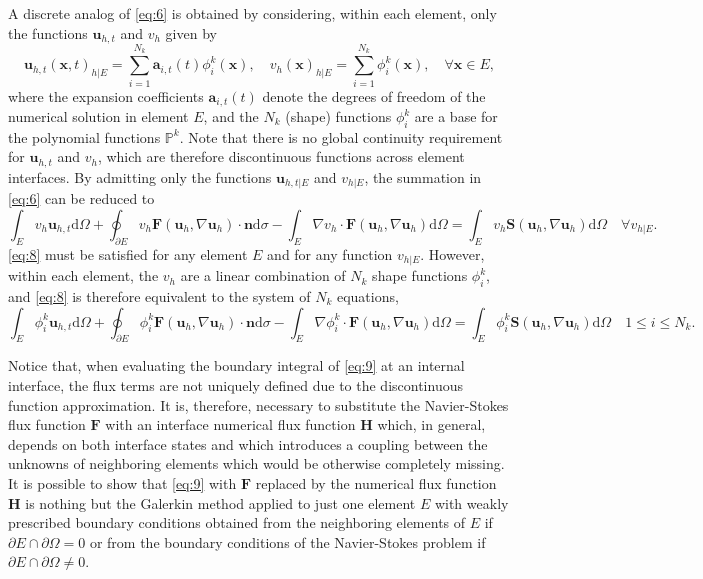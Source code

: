 \documentclass{develop-note}
\begin{document}
A discrete analog of \autoref{eq:6} is obtained by considering, within each element, only the functions $\mathbf{u}_{h,t}$ and $v_{h}$ given by
\begin{equation}
  \mathbf{u}_{h,t}(\mathbf{x},t)_{h|E}=\sum_{i=1}^{N_{k}}\mathbf{a}_{i,t}(t)\phi_{i}^{k}(\mathbf{x}),\quad v_{h}(\mathbf{x})_{h|E}=\sum_{i=1}^{N_{k}}\phi_{i}^{k}(\mathbf{x}),\quad\forall\mathbf{x}\in E,
\end{equation}
where the expansion coefficients $\mathbf{a}_{i,t}(t)$ denote the degrees of freedom of the numerical solution in element $E$, and the $N_{k}$ (shape) functions $\phi_{i}^{k}$ are a base for the polynomial functions $\mathbb{P}^{k}$. Note that there is no global continuity requirement for $\mathbf{u}_{h,t}$ and $v_{h}$, which are therefore discontinuous functions across element interfaces. By admitting only the functions $\mathbf{u}_{h,t|E}$ and $v_{h|E}$, the summation in \autoref{eq:6} can be reduced to
\begin{equation}
  \label{eq:8}
  \int_{E}v_{h}\mathbf{u}_{h,t}\mathrm{d}\Omega+\oint_{\partial E}v_{h}\mathbf{F}(\mathbf{u}_{h},\nabla\mathbf{u}_{h})\cdot\mathbf{n}\mathrm{d}\sigma-\int_{E}\nabla v_{h}\cdot\mathbf{F}(\mathbf{u}_{h},\nabla\mathbf{u}_{h})\mathrm{d}\Omega=\int_{E}v_{h}\mathbf{S}(\mathbf{u}_{h},\nabla\mathbf{u}_{h})\mathrm{d}\Omega\quad\forall v_{h|E}.
\end{equation}
\autoref{eq:8} must be satisfied for any element $E$ and for any function $v_{h|E}$. However, within each element, the $v_{h}$ are a linear combination of $N_{k}$ shape functions $\phi_{i}^{k}$, and \autoref{eq:8} is therefore equivalent to the system of $N_{k}$ equations,
\begin{equation}
  \label{eq:9}
  \int_{E}\phi_{i}^{k}\mathbf{u}_{h,t}\mathrm{d}\Omega+\oint_{\partial E}\phi_{i}^{k}\mathbf{F}(\mathbf{u}_{h},\nabla\mathbf{u}_{h})\cdot\mathbf{n}\mathrm{d}\sigma-\int_{E}\nabla\phi_{i}^{k}\cdot\mathbf{F}(\mathbf{u}_{h},\nabla\mathbf{u}_{h})\mathrm{d}\Omega=\int_{E}\phi_{i}^{k}\mathbf{S}(\mathbf{u}_{h},\nabla\mathbf{u}_{h})\mathrm{d}\Omega\quad 1\leqslant i\leqslant N_{k}.
\end{equation}

Notice that, when evaluating the boundary integral of \autoref{eq:9} at an internal interface, the flux terms are not uniquely defined due to the discontinuous function approximation. It is, therefore, necessary to substitute the Navier-Stokes flux function $\mathbf{F}$ with an interface numerical flux function $\mathbf{H}$ which, in general, depends on both interface states and which introduces a coupling between the unknowns of neighboring elements which would be otherwise completely missing. It is possible to show that \autoref{eq:9} with $\mathbf{F}$ replaced by the numerical flux function $\mathbf{H}$ is nothing but the Galerkin method applied to just one element $E$ with weakly prescribed boundary conditions obtained from the neighboring elements of $E$ if $\partial E\cap\partial\Omega =0$ or from the boundary conditions of the Navier-Stokes problem if $\partial E\cap\partial\Omega\neq 0$.
\end{document}
